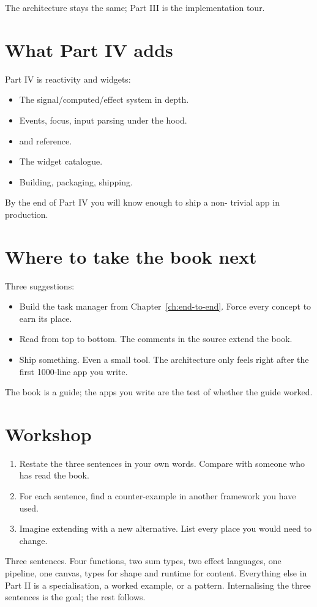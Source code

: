 The architecture stays the same; Part III is the
implementation tour.

\section{What Part IV adds}

Part IV is reactivity and widgets:

\begin{itemize}[leftmargin=*]
  \item The signal/computed/effect system in depth.
  \item Events, focus, input parsing under the hood.
  \item {} and  reference.
  \item The widget catalogue.
  \item Building, packaging, shipping.
\end{itemize}

By the end of Part IV you will know enough to ship a non-
trivial \maya{} app in production.

\section{Where to take the book next}

Three suggestions:

\begin{itemize}[leftmargin=*]
  \item Build the task manager from Chapter~\ref{ch:end-to-end}.
    Force every concept to earn its place.
  \item Read  from top to
    bottom. The comments in the source extend the book.
  \item Ship something. Even a small tool. The architecture
    only feels right after the first 1000-line app you
    write.
\end{itemize}

The book is a guide; the apps you write are the test of
whether the guide worked.

\section*{Workshop}

\begin{enumerate}[leftmargin=*]
  \item Restate the three sentences in your own words. Compare
    with someone who has read the book.
  \item For each sentence, find a counter-example in another
    framework you have used.
  \item Imagine extending \maya{} with a new 
    alternative. List every place you would need to change.
\end{enumerate}

\begin{recap}
Three sentences. Four functions, two sum types, two effect
languages, one pipeline, one canvas, types for shape and
runtime for content. Everything else in Part II is a
specialisation, a worked example, or a pattern. Internalising
the three sentences is the goal; the rest follows.
\end{recap}
